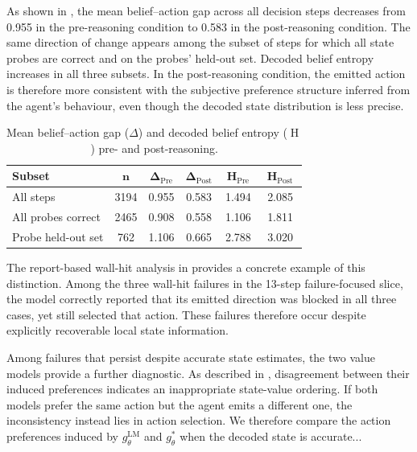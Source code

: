 \documentclass{article}
\begin{document}
As shown in , the mean belief--action gap across all decision steps decreases from 0.955 in the pre-reasoning condition to 0.583 in the post-reasoning condition.
The same direction of change appears among the subset of steps for which all state probes are correct and on the probes' held-out set. 
Decoded belief entropy increases in all three subsets.
In the post-reasoning condition, the emitted action is therefore more consistent with the subjective preference structure inferred from the agent's behaviour, even though the decoded state distribution is less precise.

\begin{table}[htbp]
\centering
\small
\begin{tabular}{lccccc}
\toprule
\textbf{Subset} & $\boldsymbol{n}$ & $\boldsymbol{\Delta_{\mathrm{Pre}}}$ & $\boldsymbol{\Delta_{\mathrm{Post}}}$
& $\boldsymbol{\operatorname{H}_{\mathrm{Pre}}}$ & $\boldsymbol{\operatorname{H}_{\mathrm{Post}}}$ \\
\midrule
All steps & 3194 & 0.955 & 0.583 & 1.494 & 2.085 \\
All probes correct & 2465 & 0.908 & 0.558 & 1.106 & 1.811 \\
Probe held-out set & 762 & 1.106 & 0.665 & 2.788 & 3.020 \\
\bottomrule
\end{tabular}
\caption{Mean belief--action gap ($\Delta$) and decoded belief entropy ($\operatorname{H}$) pre- and post-reasoning.}
\label{tab:gap-pre-post}
\end{table}

The report-based wall-hit analysis in
 provides a concrete example of this distinction.
Among the three wall-hit failures in the 13-step failure-focused slice, the
model correctly reported that its emitted direction was blocked in all three cases, yet still selected that action. These failures therefore occur despite
explicitly recoverable local state information.

Among failures that persist despite accurate state estimates, the two value models provide a further diagnostic. 
As described in , disagreement between their induced preferences indicates an inappropriate state-value ordering. 
If both models prefer the same action but the agent emits a different one, the inconsistency instead lies in action selection.
We therefore compare the action preferences induced by $g_\theta^{\mathrm{LM}}$ and $g_\theta^{*}$ when the decoded state is accurate...
\end{document}
